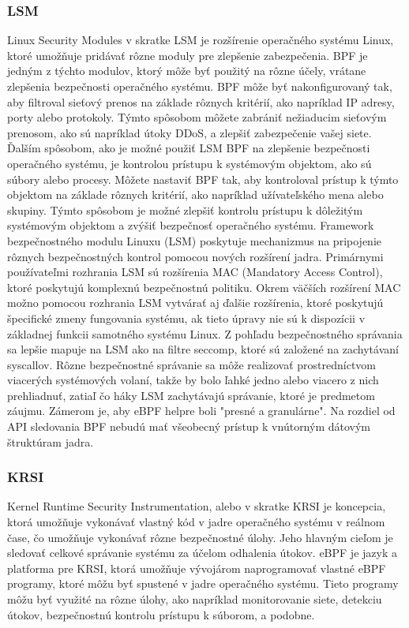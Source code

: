 \subsubsection{LSM}
Linux Security Modules v skratke LSM je rozšírenie operačného systému Linux, ktoré umožňuje pridávať rôzne moduly pre zlepšenie zabezpečenia. 
BPF je jedným z týchto modulov, ktorý môže byť použitý na rôzne účely, vrátane zlepšenia bezpečnosti operačného systému. BPF môže byť nakonfigurovaný tak, 
aby filtroval sieťový prenos na základe rôznych kritérií, ako napríklad IP adresy, porty alebo protokoly. Týmto spôsobom môžete zabrániť 
nežiaducim sieťovým prenosom, ako sú napríklad útoky DDoS, a zlepšiť zabezpečenie vašej siete. Ďalším spôsobom, ako je možné použiť LSM BPF 
na zlepšenie bezpečnosti operačného systému, je kontrolou prístupu k systémovým objektom, ako sú súbory alebo procesy. Môžete nastaviť BPF tak, 
aby kontroloval prístup k týmto objektom na základe rôznych kritérií, ako napríklad užívateľského mena alebo skupiny. Týmto spôsobom je možné 
zlepšiť kontrolu prístupu k dôležitým systémovým objektom a zvýšiť bezpečnosť operačného systému. Framework bezpečnostného modulu Linuxu (LSM) 
poskytuje mechanizmus na pripojenie rôznych bezpečnostných kontrol pomocou nových rozšírení jadra. Primárnymi používateľmi rozhrania LSM 
sú rozšírenia MAC (Mandatory Access Control), ktoré poskytujú komplexnú bezpečnostnú politiku. Okrem väčších rozšírení MAC možno pomocou 
rozhrania LSM vytvárať aj ďalšie rozšírenia, ktoré poskytujú špecifické zmeny fungovania systému, ak tieto úpravy nie sú k dispozícii 
v základnej funkcii samotného systému Linux. Z pohľadu bezpečnostného správania sa lepšie mapuje na LSM ako na filtre seccomp, 
ktoré sú založené na zachytávaní syscallov. Rôzne bezpečnostné správanie sa môže realizovať prostredníctvom viacerých systémových volaní, 
takže by bolo ľahké jedno alebo viacero z nich prehliadnuť, zatiaľ čo háky LSM zachytávajú správanie, ktoré je predmetom záujmu. 
Zámerom je, aby eBPF helpre boli "presné a granulárne". Na rozdiel od API sledovania BPF nebudú mať všeobecný prístup k vnútorným dátovým štruktúram jadra. 

\subsubsection{KRSI}
Kernel Runtime Security Instrumentation, alebo v skratke KRSI je koncepcia, ktorá umožňuje vykonávať vlastný kód v jadre operačného systému v reálnom čase, 
čo umožňuje vykonávať rôzne bezpečnostné úlohy. Jeho hlavným cieľom je sledovať celkové správanie systému za účelom odhalenia útokov.  
eBPF je jazyk a platforma pre KRSI, ktorá umožňuje vývojárom naprogramovať vlastné eBPF programy, ktoré môžu byť spustené v jadre operačného systému. 
Tieto programy môžu byť využité na rôzne úlohy, ako napríklad monitorovanie siete, detekciu útokov, bezpečnostnú kontrolu prístupu k súborom, a podobne. 
